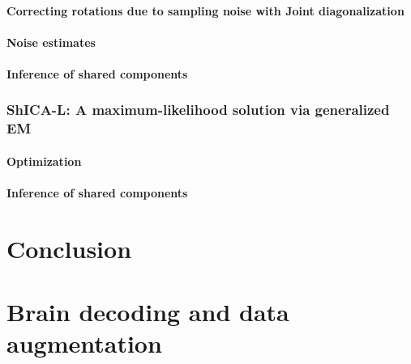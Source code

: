 \documentclass[12pt]{report}
\begin{document}
\subsubsection{Correcting rotations due to sampling noise with Joint diagonalization}
\subsubsection{Noise estimates}
\subsubsection{Inference of shared components}
\subsection{ShICA-L: A maximum-likelihood solution via generalized EM}
\subsubsection{Optimization}
\subsubsection{Inference of shared components}

\chapter{Conclusion}

\appendix
\chapter{Brain decoding and data augmentation}
\end{document}
